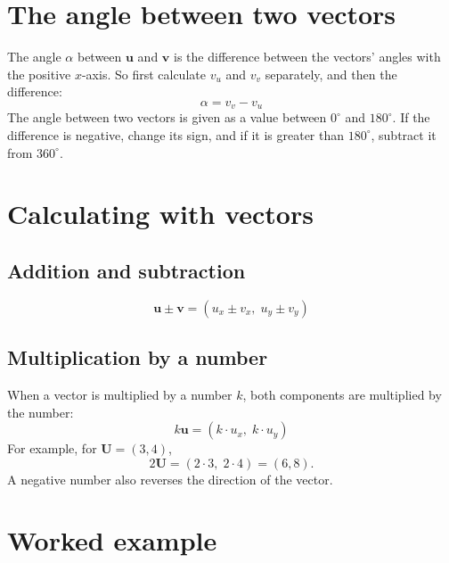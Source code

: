 \section{The angle between two vectors}
\label{c7:sec:vinkel}
The angle $\alpha$ between $\mathbf{u}$ and $\mathbf{v}$ is the difference between the vectors'
angles with the positive $x$-axis. So first calculate $v_u$ and $v_v$ separately, and then the
difference:
\[
  \alpha = v_v - v_u
\]
The angle between two vectors is given as a value between $0^{\circ}$ and $180^{\circ}$. If the
difference is negative, change its sign, and if it is greater than $180^{\circ}$, subtract it
from $360^{\circ}$.

\section{Calculating with vectors}
\label{c7:sec:rakna}

\subsection{Addition and subtraction}
\label{c7:sec:addition}
\[
  \mathbf{u} \pm \mathbf{v} = (u_x \pm v_x,\; u_y \pm v_y)
\]

\subsection{Multiplication by a number}
\label{c7:sec:multiplikation}
When a vector is multiplied by a number $k$, both components are multiplied by the number:
\[
  k\mathbf{u} = (k \cdot u_x,\; k \cdot u_y)
\]
For example, for $\mathbf{U} = (3, 4)$,
\[
  2\mathbf{U} = (2 \cdot 3,\; 2 \cdot 4) = (6, 8).
\]
A negative number also reverses the direction of the vector.

\section{Worked example}
\label{c7:sec:typexempel}

